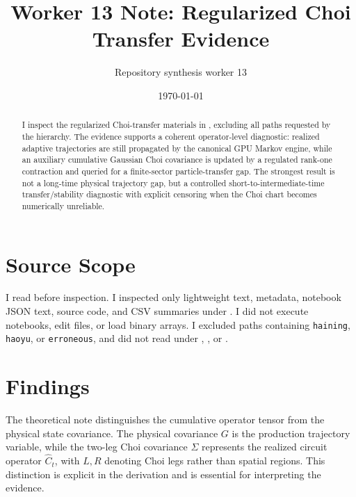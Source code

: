 \documentclass[aps,prb,onecolumn,nofootinbib,superscriptaddress]{revtex4-2}
\begin{document}
\title{Worker 13 Note: Regularized Choi Transfer Evidence}
\author{Repository synthesis worker 13}
\date{\today}

\begin{abstract}
I inspect the regularized Choi-transfer materials in
, excluding all paths requested
by the hierarchy.  The evidence supports a coherent operator-level diagnostic:
realized adaptive trajectories are still propagated by the canonical GPU Markov
engine, while an auxiliary cumulative Gaussian Choi covariance is updated by a
regulated rank-one contraction and queried for a finite-sector particle-transfer
gap.  The strongest result is not a long-time physical trajectory gap, but a
controlled short-to-intermediate-time transfer/stability diagnostic with explicit
censoring when the Choi chart becomes numerically unreliable.
\end{abstract}

\maketitle
\setcounter{tocdepth}{2}
\tableofcontents

\section{Source Scope}

I read  before inspection.  I inspected only lightweight
text, metadata, notebook JSON text, source code, and CSV summaries under
.  I did not execute notebooks,
edit files, or load binary arrays.  I excluded paths containing
\texttt{haining}, \texttt{haoyu}, or \texttt{erroneous}, and did not read under
, , or
.

\section{Findings}

The theoretical note distinguishes the cumulative operator tensor from the
physical state covariance.  The physical covariance \(G\) is the production
trajectory variable, while the two-leg Choi covariance \(\Sigma\) represents the
realized circuit operator \(\hat C_t\), with \(L,R\) denoting Choi legs rather
than spatial regions.  This distinction is explicit in the derivation and is
essential for interpreting the evidence.
\end{document}
